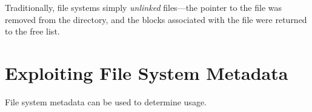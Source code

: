 \documentclass[11pt,letter]{book}
\begin{document}
Traditionally, file systems simply \emph{unlinked} files---the pointer
to the file was removed from the directory, and the blocks associated
with the file were returned to the free list.


\section{Exploiting File System Metadata}
File system metadata can be used to determine usage. 
\cite{dfrws2011:JonathanGrier}


\end{document}
